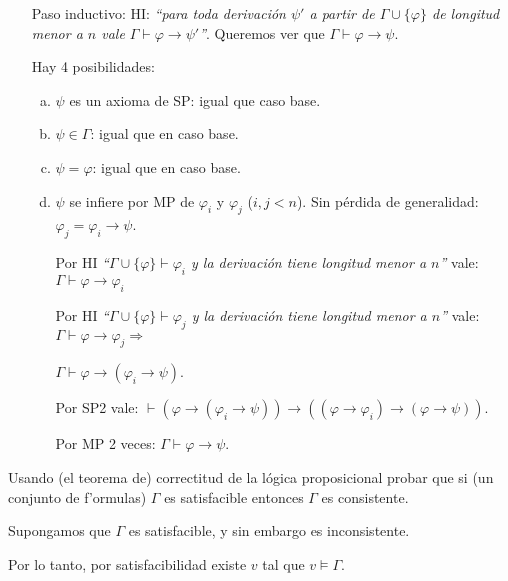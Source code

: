 \begin{questions}
\begin{solution}
\begin{itemize}[\quad]
  \item[Paso inductivo:] HI: {\it ``para toda derivaci\'on $\psi'$ a partir de $\Gamma\cup\{\varphi\}$ de longitud menor a $n$ vale $\Gamma\vdash\varphi\rightarrow\psi'$''}. Queremos ver que $\Gamma\vdash\varphi\rightarrow\psi$. 
  
  Hay 4 posibilidades: 
  \begin{enumerate}[a)]
   \item $\psi$ es un axioma de SP: igual que caso base. 
   \item $\psi\in\Gamma$: igual que en caso base. 
   \item $\psi=\varphi$: igual que en caso base. 
   \item $\psi$ se infiere por MP de $\varphi_i$ y $\varphi_j$ ($i,j<n$). Sin p\'erdida de generalidad: $\varphi_j=\varphi_i\rightarrow\psi$. 
   
    Por HI {\it ``$\Gamma\cup\{\varphi\}\vdash\varphi_i$ y la derivaci\'on tiene longitud menor a $n$''} vale: $\Gamma\vdash\varphi\rightarrow\varphi_i$
    
    Por HI {\it ``$\Gamma\cup\{\varphi\}\vdash\varphi_j$ y la derivaci\'on tiene longitud menor a $n$''} vale: $\Gamma\vdash\varphi\rightarrow\varphi_j\Rightarrow$
    
    \hfill $\Gamma\vdash\varphi\rightarrow(\varphi_i\rightarrow\psi)$.
    
    Por SP2 vale: $\vdash (\varphi\rightarrow(\varphi_i\rightarrow\psi))\rightarrow((\varphi\rightarrow\varphi_i)\rightarrow(\varphi\rightarrow\psi))$.
    
    Por MP 2 veces: $\Gamma\vdash\varphi\rightarrow\psi$.
  \end{enumerate}

 \end{itemize}

\end{solution}

\question Usando (el teorema de) correctitud de la lógica proposicional probar que si (un conjunto de f'ormulas) $\Gamma$ es satisfacible entonces $\Gamma$ es consistente. 


\begin{solution}

Supongamos que $\Gamma$ es satisfacible, y sin embargo es inconsistente. 

Por lo tanto, por satisfacibilidad existe $v$ tal que $v\vDash\Gamma$.


\end{solution}
\end{questions}
